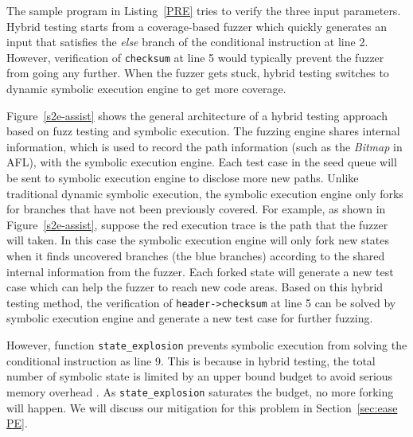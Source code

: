 The sample program in Listing~\ref{PRE} tries to verify the three input
parameters. Hybrid testing starts from a coverage-based fuzzer which
quickly generates an input that satisfies the \textit{else} branch
of the conditional instruction at line 2. However, verification of
\texttt{checksum} at line 5 would typically prevent the fuzzer from
going any further. When the fuzzer gets stuck, hybrid testing switches to
dynamic symbolic execution engine to get more coverage.


Figure~\ref{s2e-assist} shows the general architecture of a hybrid testing
approach based on fuzz testing and symbolic execution. The fuzzing
engine shares internal information, which is used to record the path
information (such as the \textit{Bitmap} in AFL), with the symbolic
execution engine. Each test case in the seed queue will be sent to
symbolic execution engine to disclose more new paths. Unlike
traditional dynamic symbolic execution, the symbolic execution engine
only forks for branches that have not been previously covered. For
example, as shown in Figure~\ref{s2e-assist}, suppose the red execution
trace is the path that the fuzzer will taken. In this case the symbolic
execution engine will only fork new states when it finds uncovered
branches (the blue branches) according to the shared internal
information from the fuzzer. Each forked state will generate a new test
case which can help the fuzzer to reach new code areas. Based on this
hybrid testing method, the verification of \texttt{header->checksum} at
line 5 can be solved by symbolic execution engine and generate a new
test case for further fuzzing.

However, function \texttt{state\_explosion} prevents symbolic execution
from solving the conditional instruction as line 9. This is because in
hybrid testing, the total number of symbolic state is limited by an
upper bound budget to avoid serious memory overhead
\cite{stephens2016driller}. As \texttt{state\_explosion} saturates the
budget, no more forking will happen.  We will discuss our mitigation
for this problem in Section~\ref{sec:ease PE}.
